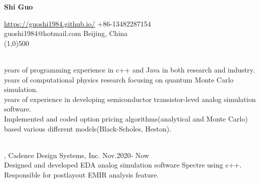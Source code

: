 \documentclass[11pt]{article} %
\begin{document}
 \centerline{\Large \bf Shi Guo}
  \noindent \url{https://guoshi1984.github.io/} \hspace{80mm}  +86-13482287154\\
    guoshi1984@hotmail.com \hspace{95mm}   Beijing, China\\
\line(1,0){500}


\vspace{1mm}

\\
 years of programming experience in c++ and Java in both research and industry.  \\
 years of computational physics research focusing on quantum Monte Carlo simulation.\\
 years of experience in developing semiconductor transistor-level analog simulation software.\\
 Implemented and coded option pricing algorithms(analytical and Monte Carlo) based various different models(Black-Scholes, Heston).\\
\vspace{1mm}




\vspace{2mm}

\\
, Cadence Design Systems, Inc. Nov.2020- Now\\
Designed and developed EDA analog simulation software Spectre using c++. Responsible for
postlayout EMIR analysis feature.\\
\vspace{0.1mm}
\end{document}
